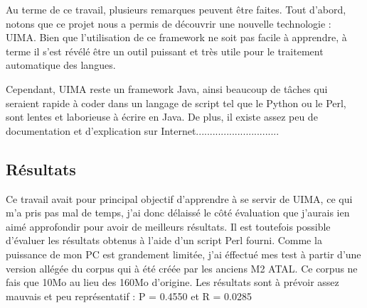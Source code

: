 \documentclass[a4paper]{article}
\begin{document}
	Au terme de ce travail, plusieurs remarques peuvent être faites. Tout d'abord, notons que ce projet nous a permis de découvrir une nouvelle technologie : UIMA. Bien que l'utilisation de ce framework ne soit pas facile à apprendre, à terme il s'est révélé être un outil puissant et très utile pour le traitement automatique des langues. 

	Cependant, UIMA reste un framework Java, ainsi beaucoup de tâches qui seraient rapide à coder dans un langage de script tel que le Python ou le Perl, sont lentes et laborieuse à écrire en Java. De plus, il existe assez peu de documentation et d'explication sur Internet..............................

	\subsection*{Résultats}
	Ce travail avait pour principal objectif d'apprendre à se servir de UIMA, ce qui m'a pris pas mal de temps, j'ai donc délaissé le côté évaluation que j'aurais ien aimé approfondir pour avoir de meilleurs résultats. Il est toutefois possible d’évaluer les résultats obtenus à l’aide d’un script Perl fourni. Comme la puissance de mon PC est grandement limitée, j'ai éffectué mes test à partir d'une version allégée du corpus qui à été créée par les anciens M2 ATAL. Ce corpus ne fais que 10Mo au lieu des 160Mo d'origine. Les résultats sont à prévoir assez mauvais et peu représentatif : P = 0.4550 et R = 0.0285

	
\end{document}
